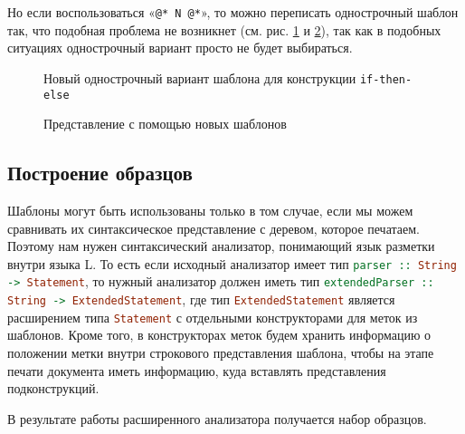 Но если воспользоваться «\lstinline{@* N @*}», то можно переписать однострочный шаблон так, что подобная проблема не возникнет (см. рис. \ref{fig:flatGoodIfTmplt} и \ref{fig:nestedIfCode}), так как в подобных ситуациях однострочный вариант просто не будет выбираться.

\begin{figure}[h!]
	
	\caption{Новый однострочный вариант шаблона для конструкции \lstinline{if-then-else}}
	\label{fig:flatGoodIfTmplt}	
\end{figure}

\begin{figure}[h!]
	\centering
	
	\caption{Представление с помощью новых шаблонов}
	\label{fig:nestedIfCode}
\end{figure}

\subsection{Построение образцов}

Шаблоны могут быть использованы только в том случае, если мы можем сравнивать их синтаксическое представление с деревом, которое печатаем. Поэтому нам нужен синтаксический анализатор, понимающий язык разметки внутри языка L. То есть если исходный анализатор имеет тип \lstinline[language=Haskell]{parser :: String -> Statement}, то нужный анализатор должен иметь тип \lstinline[language=Haskell]{extendedParser :: String -> ExtendedStatement}, где тип \lstinline[language=Haskell]{ExtendedStatement} является расширением типа \lstinline[language=Haskell]{Statement} с отдельными конструкторами для меток из шаблонов. Кроме того, в конструкторах меток будем хранить информацию о положении метки внутри строкового представления шаблона, чтобы на этапе печати документа иметь информацию, куда вставлять представления подконструкций.

В результате работы расширенного анализатора получается набор образцов.


% 	

% 	

